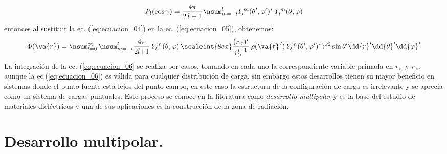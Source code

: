 \begin{align}
P_{l} (\cos \gamma) = \dfrac{4 \pi}{2 \, l + 1} \nsum_{m=-l}^{l} Y_{l}^{m} (\theta^{\prime}, \varphi^{\prime})^{*} \, Y_{l}^{m} (\theta, \varphi)
\label{eq:ecuacion_05}    
\end{align}
entonces al sustituir la ec. (\ref{eq:ecuacion_04}) en la ec. (\ref{eq:ecuacion_05}), obtenemos:
\begin{align}
\Phi (\va{r}) =  \nsum_{l=0}^{\infty} \, \nsum_{m=-l}^{l} \dfrac{4 \pi}{2 l {+} 1} \, Y_{l}^{m} (\theta, \varphi) \, \scaleint{8ex} \dfrac{(r_{<})^{l}}{r_{>}^{l+1}} \, \rho (\va{r}^{\, \prime}) \, Y_{l}^{m} (\theta^{\prime}, \varphi^{\prime})^{*} \, r^{\prime 2} \sin \theta^{\prime} \dd{r}^{\prime} \dd{\theta}^{\prime} \dd{\varphi}^{\prime}
\label{eq:ecuacion_06}
\end{align}
La integración de la ec. (\ref{eq:ecuacion_06} se realiza por casos, tomando en cada uno la correspondiente variable primada en $r_{<}$ y $r_{>}$, aunque la ec.(\ref{eq:ecuacion_06}) es válida para cualquier distribución de carga, sin embargo estos desarrollos tienen su mayor beneficio en sistemas donde el punto fuente está lejos del punto campo, en este caso la estructura de la configuración de carga es irrelevante y se aprecia como un sistema de cargas puntuales. Este proceso se conoce en la literatura como \emph{desarrollo multipolar} y es la base del estudio de materiales dieléctricos y una de sus aplicaciones es la construcción de la zona de radiación.

\section{Desarrollo multipolar.}

